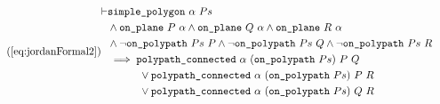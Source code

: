 \begin{equation}\tag{\ref{eq:jordanFormal2}}
\begin{aligned}
\vdash &\code{simple\_polygon}\ \alpha\ Ps\\
       &\wedge \code{on\_plane}\ P\ \alpha \wedge \code{on\_plane}\ Q\ \alpha \wedge \code{on\_plane}\ R\ \alpha\\
       &\wedge \neg\code{on\_polypath}\ Ps\ P\wedge \neg\code{on\_polypath}\ Ps\ Q\wedge \neg\code{on\_polypath}\ Ps\ R\\
       &\implies \code{polypath\_connected}\ \alpha\ (\code{on\_polypath}\ Ps)\ P\ Q\\
       &\qquad\quad\vee \code{polypath\_connected}\ \alpha\ (\code{on\_polypath}\ Ps)\ P\ R\\
       &\qquad\quad\vee \code{polypath\_connected}\ \alpha\ (\code{on\_polypath}\ Ps)\ Q\ R
\end{aligned}
\end{equation}

